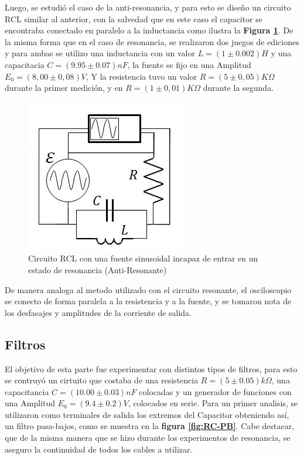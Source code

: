 \documentclass[11pt,a4paper]{article}
\begin{document}
Luego, se estudió el caso de la anti-resonancia, y para esto se diseño un circuito RCL similar al anterior, con la salvedad que en este caso el capacitor se encontraba conectado en paralelo a la inductancia como ilustra la \textbf{Figura \ref{fig:RCL-ARes}}. De la misma forma que en el caso de resonancia, se realizaron dos juegos de ediciones y para ambas se utilizo una inductancia con un valor $L = (1 \pm0.002)H$ y una capacitacia $C = (9.95 \pm 0.07)nF$, la fuente se fijo en una Amplitud $E_{0} = (8,00 \pm 0,08)V$, Y la resistencia tuvo un valor $R = (5 \pm 0,05)K\Omega$ durante la primer medición, y en $R = (1 \pm 0,01)K\Omega$ durante la segunda.

\begin{figure}[h]
\centering
\includegraphics[scale=0.7]{Circuito-RCL-AntiResonante}
  \caption{Circuito RCL con una fuente sinusoidal incapaz de entrar en un estado de resonancia (Anti-Resonante)}
  \label{fig:RCL-ARes}
\end{figure}

De manera analoga al metodo utilizado con el circuito resonante, el osciloscopio se conecto de forma paralela a la resistencia y a la fuente, y se tomaron nota de los desfasajes y amplitudes de la corriente de salida.


\subsection{Filtros}

El objetivo de esta parte fue experimentar con distintos tipos de filtros, para esto se contruyó un cirtuito que costaba de una resistencia $R = (5 \pm 0.05)k\Omega$, una capacitancia $C = (10.00 \pm 0.03)nF$ colocadas y un generador de funciones con una Amplitud $E_{0} = (9.4 \pm 0.2)V$, colocados en serie. Para un primer analisis, se utilizaron como terminales de salida los extremos del Capacitor obteniendo así, un filtro pasa-bajos, como se muestra en la \textbf{figura \ref{fig:RC-PB}}. Cabe destacar, que de la misma manera que se hizo durante los experimentos de resonancia, se aseguro la continuidad de todos los cables a utilizar.
\end{document}
